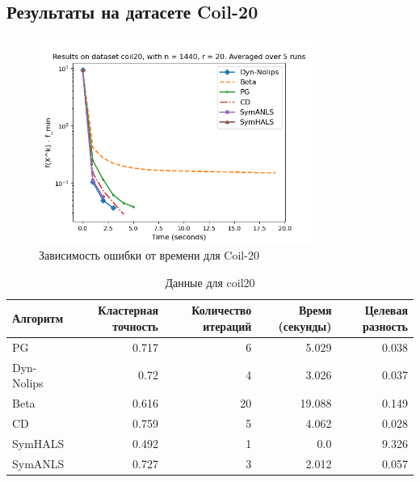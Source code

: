 \documentclass[a4paper,11pt]{article}
\begin{document}
\subsection{Результаты на датасете Coil-20}
\begin{figure}[h!]
    \centering \includegraphics[width=0.8\textwidth]{my_plot_coil20.png}
    \caption{Зависимость ошибки от времени для Coil-20}
    \label{fig:coil20}
\end{figure}
\begin{table}[h!]
    \centering
    \caption{Данные для coil20}
    \label{tab:clustering_accuracy_coil20}
    \begin{tabular}{|l|r|r|r|r|}
        \hline
        Алгоритм & Кластерная точность & Количество итераций & Время (секунды) & Целевая разность \\
        \hline
        PG & 0.717 & 6 & 5.029 & 0.038 \\
        Dyn-Nolips & 0.72 & 4 & 3.026 & 0.037 \\
        Beta & 0.616 & 20 & 19.088 & 0.149 \\
        CD & 0.759 & 5 & 4.062 & 0.028 \\
        SymHALS & 0.492 & 1 & 0.0 & 9.326 \\
        SymANLS & 0.727 & 3 & 2.012 & 0.057 \\
        \hline
    \end{tabular}
    \end{table}
\newpage
\end{document}
